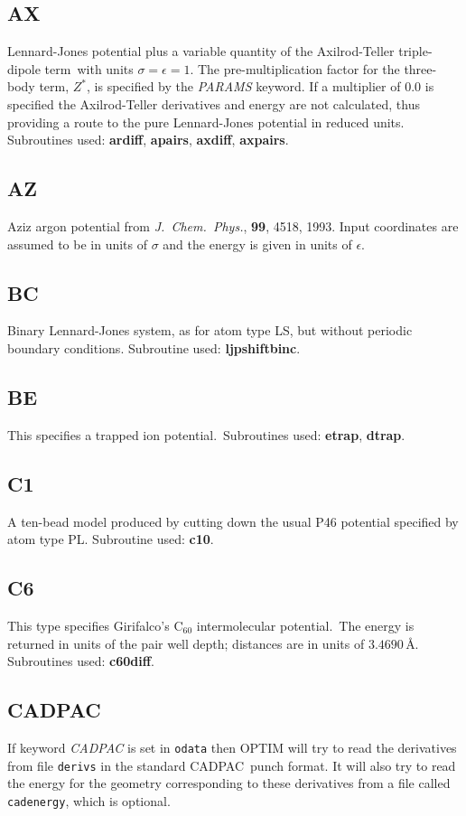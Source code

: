 \documentclass[12pt,a4paper,dvips]{article}
\begin{document}
\subsection{AX}Lennard-Jones potential plus a variable quantity of the Axilrod-Teller
triple-dipole term\cite{wales90c,doyew92}\ with units $\sigma=\epsilon=1$. 
The pre-multiplication factor for
the three-body term, $Z^*$, is specified by the {\it PARAMS\/} keyword.
If a multiplier of $0.0$ is specified the Axilrod-Teller derivatives
and energy are not calculated, thus providing a route to the pure Lennard-Jones potential
in reduced units. Subroutines used: {\bf ardiff}, {\bf apairs}, {\bf axdiff}, {\bf axpairs}.

\subsection{AZ}Aziz argon potential from {\it J.~Chem.~Phys.\/}, {\bf 99}, 4518, 1993.
Input coordinates are assumed to be in units of $\sigma$ and the energy is given in
units of $\epsilon$.

\subsection{BC}Binary Lennard-Jones system, as for atom type LS, but without periodic
boundary conditions. Subroutine used: {\bf ljpshiftbinc}.

\subsection{BE}This specifies a trapped ion potential.\cite{walesl93}\
Subroutines used: {\bf etrap}, {\bf dtrap}.

\subsection{C1}A ten-bead model produced by cutting down the usual P46 potential specified
by atom type PL. Subroutine used: {\bf c10}.

\subsection{C6}This type specifies Girifalco's C$_{60}$ intermolecular potential.\cite{girifalco92}\
The energy is returned in units of the pair well depth; distances are in units of $3.4690\,$\AA.
Subroutines used: {\bf c60diff}.

\subsection{CADPAC}If keyword {\it CADPAC\/} is set in {\tt odata} then
OPTIM will try to read the derivatives from file {\tt derivs} in the
standard CADPAC\cite{CADPAC}\ punch format. 
It will also try to read the energy for the geometry
corresponding to these derivatives from a file called {\tt cadenergy}, which is optional.
\end{document}
